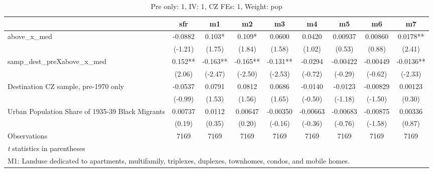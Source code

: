 \begin{table}[htbp]\centering
\def\sym#1{\ifmmode^{#1}\else\(^{#1}\)\fi}
\caption{Pre only: 1, IV: 1, CZ FEs: 1, Weight: pop}
\begin{tabular}{l*{8}{c}}
\toprule
                    &\multicolumn{1}{c}{sfr}&\multicolumn{1}{c}{m1}&\multicolumn{1}{c}{m2}&\multicolumn{1}{c}{m3}&\multicolumn{1}{c}{m4}&\multicolumn{1}{c}{m5}&\multicolumn{1}{c}{m6}&\multicolumn{1}{c}{m7}\\
\midrule
above\_x\_med         &     -0.0882   &       0.103*  &       0.109*  &      0.0600   &      0.0420   &     0.00937   &     0.00860   &      0.0178** \\
                    &     (-1.21)   &      (1.75)   &      (1.84)   &      (1.58)   &      (1.02)   &      (0.53)   &      (0.88)   &      (2.41)   \\
\addlinespace
samp\_dest\_preXabove\_x\_med&       0.152** &      -0.163** &      -0.165** &      -0.131** &     -0.0294   &    -0.00422   &    -0.00449   &     -0.0136** \\
                    &      (2.06)   &     (-2.47)   &     (-2.50)   &     (-2.53)   &     (-0.72)   &     (-0.29)   &     (-0.62)   &     (-2.33)   \\
\addlinespace
Destination CZ sample, pre-1970 only&     -0.0537   &      0.0791   &      0.0812   &      0.0686   &     -0.0140   &     -0.0123   &    -0.00829   &     0.00123   \\
                    &     (-0.99)   &      (1.53)   &      (1.56)   &      (1.65)   &     (-0.50)   &     (-1.18)   &     (-1.50)   &      (0.30)   \\
\addlinespace
Urban Population Share of 1935-39 Black Migrants&     0.00737   &      0.0112   &     0.00647   &    -0.00350   &    -0.00663   &    -0.00683   &    -0.00875   &     0.00336   \\
                    &      (0.19)   &      (0.35)   &      (0.20)   &     (-0.16)   &     (-0.36)   &     (-0.76)   &     (-1.58)   &      (0.87)   \\
\midrule
Observations        &        7169   &        7169   &        7169   &        7169   &        7169   &        7169   &        7169   &        7169   \\
\bottomrule
\multicolumn{9}{l}{\footnotesize \textit{t} statistics in parentheses}\\
\multicolumn{9}{l}{\footnotesize M1: Landuse dedicated to apartments, multifamily, triplexes, duplexes, townhomes, condos, and mobile homes.}\\

\end{tabular}
\end{table}
